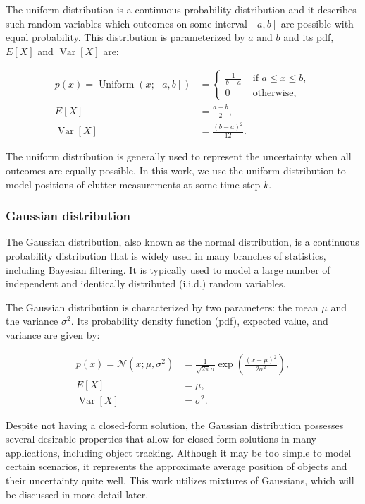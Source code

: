 The uniform distribution is a continuous probability distribution and it
describes such random variables which outcomes on some interval $[a, b]$
are possible with equal probability. This distribution is parameterized by
$a$ and $b$ and its pdf, $E[X]$ and $\operatorname{Var}[X]$ are:

$$
\begin{aligned}
    p(x)
        =\operatorname{Uniform}(x; [a, b])
        &= \begin{cases}
            \frac{1}{b-a} & \text { if } a \leq x \leq b, \\
            0 & \text { otherwise, }
        \end{cases} \\
    E[X] &= \frac{a + b}{2}, \\
    \operatorname{Var}[X] &= \frac{(b - a)^2}{12}.
\end{aligned}
$$

The uniform distribution is generally used to represent the uncertainty when
all outcomes are equally possible. In this work, we use the uniform distribution
to model positions of clutter measurements at some time step $k$.

\subsubsection{Gaussian distribution}

The Gaussian distribution, also known as the normal distribution, is a 
continuous probability distribution that is widely used in many branches
of statistics, including Bayesian filtering. It is typically used to model
a large number of independent and identically distributed (i.i.d.) random variables.

The Gaussian distribution is characterized by two parameters: the mean 
$\mu$ and the variance $\sigma^2$. Its probability density function (pdf), 
expected value, and variance are given by:

$$
\begin{aligned}
    p(x)
        =\mathscr{N}\left(x ; \mu, \sigma^2\right)
        &=\frac{1}{\sqrt{2 \pi} \sigma} \exp \left(\frac{(x-\mu)^2}{2 \sigma^2}\right), \\
    E[X] &= \mu, \\
    \operatorname{Var}[X] &= \sigma^2.
\end{aligned}
$$

Despite not having a closed-form solution, the Gaussian distribution 
possesses several desirable properties that allow for closed-form solutions 
in many applications, including object tracking. Although it may be too 
simple to model certain scenarios, it represents the approximate average 
position of objects and their uncertainty quite well. This work utilizes
mixtures of Gaussians, which will be discussed in more detail later.